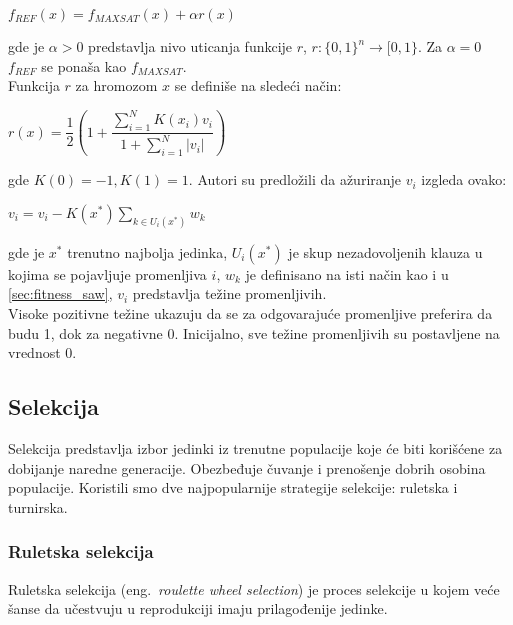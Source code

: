 \documentclass{article}
\begin{document}
\begin{center}
	$ f_{REF} (x) = f_{MAXSAT} (x) + \alpha r(x) $
\end{center}

gde je $\alpha > 0 $ predstavlja nivo uticanja funkcije $r$, $ r : \lbrace 0, 1 \rbrace ^ n \rightarrow [0, 1 \rbrace $. 
Za $\alpha = 0 $ $f_{REF} $ se ponaša kao $f_{MAXSAT} $. \\

Funkcija $r$ za hromozom $x$ se definiše na sledeći način:\\

\begin{center}
	$ r(x) = \dfrac{1}{2} ( 1 + \dfrac{\sum_{i=1}^{N} K(x_i) v_i} {1+ \sum_{i=1}^{N} |v_i|} ) $
\end{center}

gde  $ K(0) = -1, K(1) = 1 $. Autori su predložili da ažuriranje $v_i$  izgleda ovako: \\
 
\begin{center}
	$ v_i = v_i - K(x^*) \sum_{k \in U_i(x^*)} w_k $
\end{center}

gde je $x^*$ trenutno najbolja jedinka, $U_i (x^*)$ je skup nezadovoljenih klauza u kojima se pojavljuje promenljiva $i$, $w_k$ je definisano na isti način kao i u \ref{sec:fitness_saw}, $v_i$ predstavlja težine promenljivih.\\

Visoke pozitivne težine ukazuju da se za odgovarajuće promenljive preferira da budu 1, dok za negativne 0. Inicijalno, sve težine promenljivih su postavljene na vrednost 0.

\subsection{Selekcija}
\label{sec:ea_selekcija}
Selekcija predstavlja izbor jedinki iz trenutne populacije koje će biti korišćene za dobijanje naredne generacije. Obezbeđuje čuvanje i prenošenje dobrih osobina populacije. Koristili smo dve najpopularnije strategije selekcije: ruletska i turnirska.

\subsubsection{Ruletska selekcija}
\label{sec:ea_ruletska}
Ruletska selekcija (eng.~{\em roulette wheel selection}) \cite{vi_Janicic} je proces selekcije u kojem veće šanse da učestvuju u reprodukciji imaju prilagođenije jedinke.\
\end{document}

